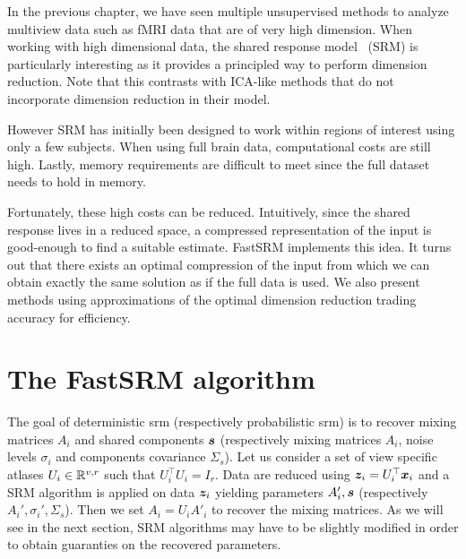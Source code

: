 In the previous chapter, we have seen multiple unsupervised methods to analyze
multiview data such as fMRI data that are of very high dimension.
When working with high dimensional data, the shared response model~\cite{chen2015reduced} (SRM) is particularly
interesting as it provides a principled way to perform dimension reduction. Note that this
contrasts with ICA-like methods that do not incorporate dimension reduction in their model.

However SRM has initially been designed to work within regions of interest using
only a few subjects. When using full brain data, computational costs are still
high. Lastly, memory requirements are difficult to meet since the full dataset needs to hold
in memory.

Fortunately, these high costs can be reduced. Intuitively, since the shared
response lives in a reduced space, a compressed representation of the input is
good-enough to find a suitable estimate.
FastSRM implements this idea. It turns out that there exists an optimal
compression of the input from which we can obtain exactly the same solution as
if the full data is used. We also present methods using approximations of the
optimal dimension reduction trading accuracy for efficiency.

\section{The FastSRM algorithm}
The goal of deterministic srm (respectively probabilistic srm) is to recover mixing matrices $A_i$ and shared
components $\boldsymbol{s}$ (respectively mixing matrices $A_i$, noise levels
$\sigma_i$ and components covariance $\Sigma_s$). 
Let us consider a set of view specific atlases $U_i \in \mathbb{R}^{v, r}$ such that
$U_i^{\top}U_i = I_r$.
Data are reduced using $\boldsymbol{z}_i = U_i^{\top} \boldsymbol{x}_i$ and a SRM algorithm is applied
on data $\boldsymbol{z}_i$ yielding parameters $A_i', \boldsymbol{s}$ (respectively $A_i',
\sigma_i', \Sigma_s$). Then we set $A_i = U_i A'_i$ to recover the mixing matrices.
As we will see in the next section, SRM algorithms may have to be slightly
modified in order to obtain guaranties on the recovered parameters.

